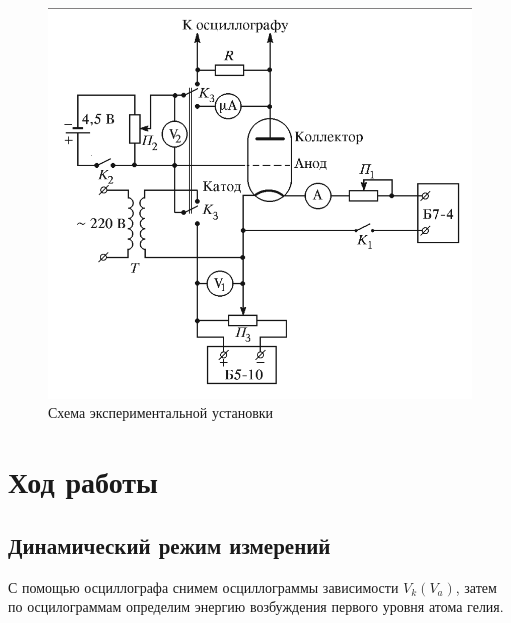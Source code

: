     \begin{figure}[!h]
        \centering
        \includegraphics[width = 13 cm]{images/exp_equipment}
        \caption{Схема экспериментальной установки}
        \label{fig:exp_eq}
    \end{figure}
    
\section{Ход работы}

\subsection{Динамический режим измерений}

    С помощью осциллографа снимем осциллограммы зависимости $V_k(V_a)$, затем по осцилограммам определим энергию возбуждения первого уровня атома гелия.

